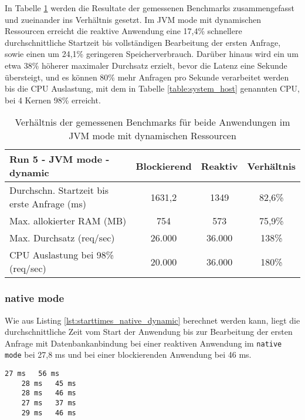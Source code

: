 In Tabelle \ref{table:dynamic_jvm_measurement_results} werden die Resultate der gemessenen Benchmarks zusammengefasst
und zueinander ins Verhältnis gesetzt. Im JVM mode mit dynamischen Ressourcen erreicht die reaktive Anwendung
eine 17,4\% schnellere durchschnittliche Startzeit bis vollständigen Bearbeitung der ersten Anfrage, sowie
einen um 24,1\% geringeren Speicherverbrauch.
Darüber hinaus wird ein um etwa 38\% höherer maximaler Durchsatz erzielt, bevor die Latenz eine Sekunde übersteigt, und
es können 80\% mehr Anfragen pro Sekunde verarbeitet werden bis die CPU Auslastung, mit dem in Tabelle \ref{table:system_host}
genannten CPU, bei 4 Kernen 98\% erreicht.

\begin{table}[ht!]
    \begin{tabular}{|l | c | c | c|}
        \hline
        Run 5 - JVM mode - dynamic & Blockierend & Reaktiv & Verhältnis \\
        \hline
        \makecell[l]{Durchschn. Startzeit bis                           \\erste Anfrage (ms)} &   1631,2    &  1349  &   82,6\%   \\
        \hline
        Max. allokierter RAM (MB)  & 754         & 573     & 75,9\%     \\
        \hline
        Max. Durchsatz (req/sec)   & 26.000      & 36.000  & 138\%      \\
        \hline
        \makecell[l]{CPU Auslastung bei 98\%                            \\ (req/sec)} & 20.000 & 36.000 & 180\%  \\
        \hline
    \end{tabular}
    \caption{Verhältnis der gemessenen Benchmarks für beide Anwendungen im JVM mode mit dynamischen Ressourcen}
    \label{table:dynamic_jvm_measurement_results}
\end{table}


\subsubsection{native mode}
\label{subsubsec:dynamic_native_mode}
Wie aus Listing \ref{lst:starttimes_native_dynamic} berechnet werden kann, liegt die durchschnittliche Zeit vom Start der Anwendung
bis zur Bearbeitung der ersten Anfrage mit Datenbankanbindung bei einer reaktiven Anwendung im \verb|native mode| bei 27,8 ms und bei
einer blockierenden Anwendung bei 46 ms.

\begin{lstlisting}[caption=5 gemessene Startzeiten bis zur Bearbeitung der ersten Anfrage als native-Anwendungen: links ist die reaktive
     Anwendung und rechts die blockierende Anwendung, captionpos=b, label=lst:starttimes_native_dynamic]
    27 ms   56 ms
    28 ms   45 ms
    28 ms   46 ms
    27 ms   37 ms
    29 ms   46 ms
\end{lstlisting}

